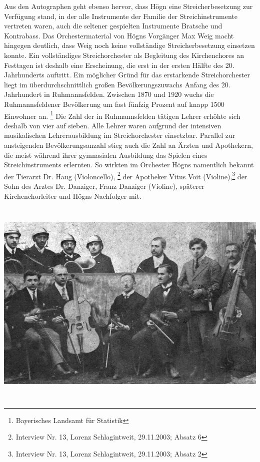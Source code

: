 \documentclass[a4paper]{article}
\begin{document}
Aus den Autographen geht ebenso hervor, dass Högn eine
Streicherbesetzung zur Verfügung stand, in der alle Instrumente der
Familie der Streichinstrumente vertreten waren, auch die seltener
gespielten Instrumente Bratsche und Kontrabass. Das Orchestermaterial
von Högns Vorgänger Max Weig macht hingegen deutlich, dass Weig noch
keine vollständige Streicherbesetzung einsetzen konnte. Ein
vollständiges Streichorchester als Begleitung des Kirchenchores an
Festtagen ist deshalb eine Erscheinung, die erst in der ersten Hälfte
des 20. Jahrhunderts auftritt. Ein möglicher Gründ für das erstarkende
Streichorchester liegt im überdurchschnittlich großen
Bevölkerungszuwachs Anfang des 20. Jahrhundert in Ruhmannsfelden.
Zwischen 1870 und 1920 wuchs die Ruhmannsfeldener Bevölkerung um fast
fünfzig Prozent auf knapp 1500 Einwohner an. \footnote{Bayerisches
Landsamt für Statistik} Die Zahl der in Ruhmannsfelden tätigen Lehrer
erhöhte sich deshalb von vier auf sieben. Alle Lehrer waren aufgrund
der intensiven musikalischen Lehrerausbildung im Streichorchester
einsetzbar. Parallel zur ansteigenden Bevölkerungsanzahl stieg auch die
Zahl an Ärzten und Apothekern, die meist während ihrer gymnasialen
Ausbildung das Spielen eines Streichinstruments erlernten. So wirkten
im Orchester Högns namentlich bekannt der Tierarzt Dr. Haug
(Violoncello), \footnote{Interview Nr. 13, Lorenz Schlagintweit,
29.11.2003; Absatz 6} der Apotheker Vitus Voit (Violine),\footnote{
Interview Nr. 13, Lorenz Schlagintweit, 29.11.2003; Absatz 2} der Sohn
des Arztes Dr. Danziger, Franz Danziger (Violine), späterer
Kirchenchorleiter und Högns Nachfolger mit.


\includegraphics[width=15.822cm,height=10.109cm]{pictures/zulassungsarbeit-img072.jpg}
\end{document}

